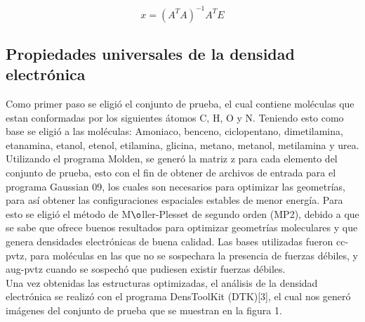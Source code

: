 \documentclass[12pt,letterpaper]{article}
\begin{document}
\begin{center}
 \begin{equation}
  x = (A^T A)^{-1} A^T E
 \end{equation}

\end{center}


\subsection{Propiedades universales de la densidad electrónica} 
Como primer paso se eligió el conjunto de prueba, el cual contiene moléculas que estan conformadas por los siguientes átomos C, H, O y N. Teniendo esto como base se eligió  a las moléculas: Amoniaco, benceno, ciclopentano, dimetilamina, etanamina, etanol, etenol, etilamina, glicina, metano, metanol, metilamina y urea.\\
Utilizando el programa Molden, se generó la matriz z para cada elemento del conjunto de prueba, esto con el fin de obtener de archivos de entrada para el programa Gaussian 09, los cuales son necesarios para optimizar las geometrías, para así obtener las configuraciones espaciales estables de menor energía. Para esto se eligió el método de M$\o$ller-Plesset de segundo orden (MP2), debido a que se sabe que ofrece buenos resultados para optimizar geometrías moleculares y que genera densidades electrónicas de buena calidad. Las bases utilizadas fueron cc-pvtz, para moléculas en las que no se sospechara la presencia de fuerzas débiles, y aug-pvtz cuando se sospechó que pudiesen existir fuerzas débiles.
\\
Una vez obtenidas las estructuras optimizadas, el análisis de la densidad electrónica se realizó con el programa DensToolKit (DTK)[3], el cual nos generó imágenes del conjunto de prueba que se muestran en la figura 1.\\
\end{document}
